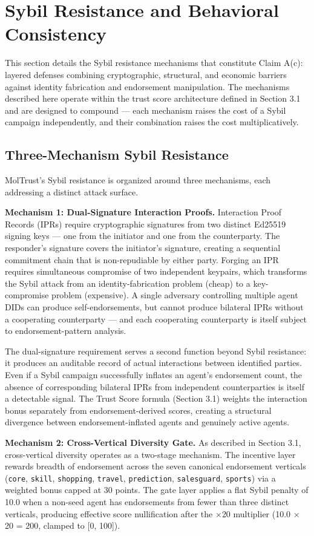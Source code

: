 \section{Sybil Resistance and Behavioral Consistency}

This section details the Sybil resistance mechanisms that constitute Claim A(c): layered defenses combining cryptographic, structural, and economic barriers against identity fabrication and endorsement manipulation. The mechanisms described here operate within the trust score architecture defined in Section 3.1 and are designed to compound — each mechanism raises the cost of a Sybil campaign independently, and their combination raises the cost multiplicatively.


\subsection{Three-Mechanism Sybil Resistance}

MolTrust's Sybil resistance is organized around three mechanisms, each addressing a distinct attack surface.


\textbf{Mechanism 1: Dual-Signature Interaction Proofs.} Interaction Proof Records (IPRs) require cryptographic signatures from two distinct Ed25519 signing keys — one from the initiator and one from the counterparty. The responder's signature covers the initiator's signature, creating a sequential commitment chain that is non-repudiable by either party. Forging an IPR requires simultaneous compromise of two independent keypairs, which transforms the Sybil attack from an identity-fabrication problem (cheap) to a key-compromise problem (expensive). A single adversary controlling multiple agent DIDs can produce self-endorsements, but cannot produce bilateral IPRs without a cooperating counterparty — and each cooperating counterparty is itself subject to endorsement-pattern analysis.


The dual-signature requirement serves a second function beyond Sybil resistance: it produces an auditable record of actual interactions between identified parties. Even if a Sybil campaign successfully inflates an agent's endorsement count, the absence of corresponding bilateral IPRs from independent counterparties is itself a detectable signal. The Trust Score formula (Section 3.1) weights the interaction bonus separately from endorsement-derived scores, creating a structural divergence between endorsement-inflated agents and genuinely active agents.


\textbf{Mechanism 2: Cross-Vertical Diversity Gate.} As described in Section 3.1, cross-vertical diversity operates as a two-stage mechanism. The incentive layer rewards breadth of endorsement across the seven canonical endorsement verticals (\texttt{core}, \texttt{skill}, \texttt{shopping}, \texttt{travel}, \texttt{prediction}, \texttt{salesguard}, \texttt{sports}) via a weighted bonus capped at 30 points. The gate layer applies a flat Sybil penalty of 10.0 when a non-seed agent has endorsements from fewer than three distinct verticals, producing effective score nullification after the $\times$20 multiplier (10.0 $\times$ 20 = 200, clamped to [0, 100]).


